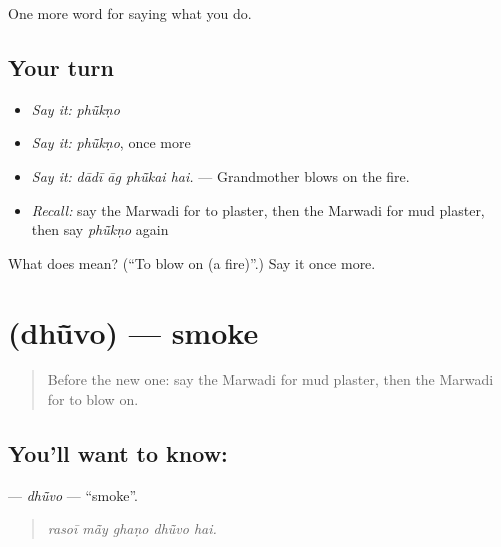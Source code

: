 \begin{grammarlens}[title={What you've built}]
One more word for saying what you do.
\end{grammarlens}

\subsection*{Your turn}
\begin{itemize}
\raggedright
  \item \emph{Say it:} \emph{phū̃kṇo}
  \item \emph{Say it:} \emph{phū̃kṇo}, once more
  \item \emph{Say it:} \emph{dādī āg phū̃kai hai.} — Grandmother blows on the fire.
  \item \emph{Recall:} say the Marwadi for to plaster, then the Marwadi for mud plaster, then say \emph{phū̃kṇo} again
\end{itemize}

\begin{tcolorbox}[breakable,colback=teal!4,colframe=teal!35!black,title={Before you move on}]
What does  mean? (\textquotedblleft{}To blow on (a fire)\textquotedblright{}.) Say it once more.
\end{tcolorbox}
\section[\texorpdfstring{\mw{धूंवो} (dhū̃vo)}{धूंवो (dhū̃vo)}]{ (dhū̃vo) — smoke}

\label{lesson:MW-C173-dhuvo}



\begin{quote}
Before the new one: say the Marwadi for mud plaster, then the Marwadi for to blow on.
\end{quote}

\subsection*{You'll want to know: }
\textbf{} — \emph{dhū̃vo} — \textquotedblleft{}smoke\textquotedblright{}.

\begin{quote}
    
\end{quote}

\begin{quote}
\emph{rasoī mā̃y ghaṇo dhū̃vo hai.}
\end{quote}

